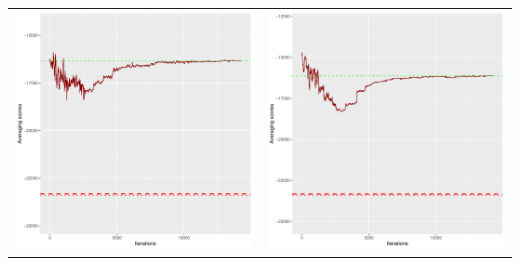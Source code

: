 \documentclass[]{scrartcl}
\begin{document}
\begin{table}[h!]
\begin{tabular}{cc}
\includegraphics[scale = 0.4]{./figs/win95pts/v1/25/avgBoundsEvolution-14252.pdf} & 
\includegraphics[scale = 0.4]{./figs/win95pts/v1/50/avgBoundsEvolution-14252.pdf} \\

\end{tabular}
\end{table}
\end{document}

